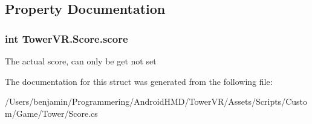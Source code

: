 \subsection{Property Documentation}
\subsubsection[{\texorpdfstring{score}{score}}]{\setlength{\rightskip}{0pt plus 5cm}int Tower\+V\+R.\+Score.\+score\hspace{0.3cm}{\ttfamily [get]}}\hypertarget{struct_tower_v_r_1_1_score_a0c15824361f37b888d650812d162970d}{}\label{struct_tower_v_r_1_1_score_a0c15824361f37b888d650812d162970d}
The actual score, can only be get not set 

The documentation for this struct was generated from the following file\+:\begin{DoxyCompactItemize}
\item 
/\+Users/benjamin/\+Programmering/\+Android\+H\+M\+D/\+Tower\+V\+R/\+Assets/\+Scripts/\+Custom/\+Game/\+Tower/Score.\+cs\end{DoxyCompactItemize}
